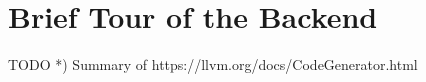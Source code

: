 
\section{Brief Tour of the Backend}


\begin{frame}{TODO}
*) Summary of https://llvm.org/docs/CodeGenerator.html
\end{frame}
